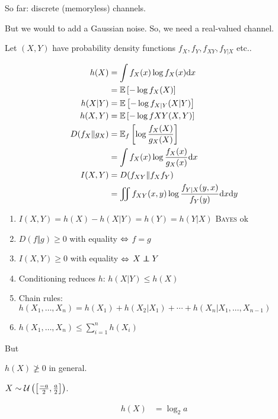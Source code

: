 So far: discrete (memoryless) channels.

But we would to add a Gaussian noise. So, we need a real-valued channel.

Let $(X,Y)$ have probability density functions $f_X, f_Y, f_{XY}, f_{Y\vert X}$ etc..

\[
    \begin{aligned}
        h(X) &= \int f_X(x) \log f_X(x) \mathrm{d} x\\
        &= \mathbb{E}\left[ -\log f_X(X) \right]\\
        h(X\vert Y) &= \mathbb{E}\left[ -\log f_{X\vert Y} (X\vert Y) \right]\\
        h(X,Y) &= \mathbb{E}\left[ -\log f{XY}(X,Y) \right]\\
        D(f_X \Vert g_X) &= \mathbb{E}_f\left[\log\frac{f_X(X)}{g_X(X)}\right]\\
        &= \int f_X(x) \log \frac{f_X(x)}{g_X(x)} \mathrm{d} x\\
        I(X,Y) &= D(f_{XY} \Vert f_X f_Y)\\
        &=\iint f_{XY}(x,y) \log \frac{f_{Y\vert X}(y,x)}{f_Y(y)} \mathrm{d} x\mathrm{d} y
    \end{aligned}
\]

\begin{enumerate}
    \item $I(X,Y) = h(X) - h(X\vert Y) = h(Y) = h(Y\vert X)$ \textsc{Bayes} ok
    \item $D(f\Vert g) \geqslant 0$ with equality $\Leftrightarrow$ $f = g$
    \item $I(X,Y) \geqslant 0$ with equality $\Leftrightarrow$ $X \perp\hspace{-7pt}\perp Y$
    \item Conditioning reduces $h$: $h(X\vert Y) \leqslant h(X)$
    \item Chain rules: $h(X_1,\ldots, X_n) = h(X_1) + h(X_2 \vert X_1) + \cdots + h(X_n \vert X_1,\ldots,X_{n-1})$
    \item $h(X_1,\ldots,X_n) \leqslant \sum\limits_{i=1}^n h(X_i)$
\end{enumerate}

But

$h(X) \not\geqslant 0$ in general.

\begin{example}
    $X \sim \mathcal{U}\left( \left[ \frac{-a}{2},\frac{a}{2} \right] \right)$.
    
    \[
        \begin{aligned}
            h(X) &= \log_2 a\\
        \end{aligned}
    \]
\end{example}

